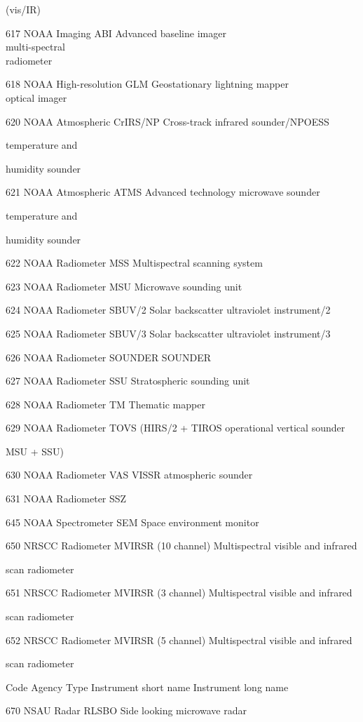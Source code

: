(vis/IR)

617 NOAA Imaging ABI Advanced baseline imager\\
multi-spectral\\
radiometer

618 NOAA High-resolution GLM Geostationary lightning mapper\\
optical imager

620 NOAA Atmospheric CrIRS/NP Cross-track infrared sounder/NPOESS

temperature and

humidity sounder

621 NOAA Atmospheric ATMS Advanced technology microwave sounder

temperature and

humidity sounder

622 NOAA Radiometer MSS Multispectral scanning system

623 NOAA Radiometer MSU Microwave sounding unit

624 NOAA Radiometer SBUV/2 Solar backscatter ultraviolet instrument/2

625 NOAA Radiometer SBUV/3 Solar backscatter ultraviolet instrument/3

626 NOAA Radiometer SOUNDER SOUNDER

627 NOAA Radiometer SSU Stratospheric sounding unit

628 NOAA Radiometer TM Thematic mapper

629 NOAA Radiometer TOVS (HIRS/2 + TIROS operational vertical sounder

MSU + SSU)

630 NOAA Radiometer VAS VISSR atmospheric sounder

631 NOAA Radiometer SSZ

645 NOAA Spectrometer SEM Space environment monitor

650 NRSCC Radiometer MVIRSR (10 channel) Multispectral visible and infrared

scan radiometer

651 NRSCC Radiometer MVIRSR (3 channel) Multispectral visible and infrared

scan radiometer

652 NRSCC Radiometer MVIRSR (5 channel) Multispectral visible and infrared

scan radiometer

Code Agency Type Instrument short name Instrument long name

670 NSAU Radar RLSBO Side looking microwave radar

